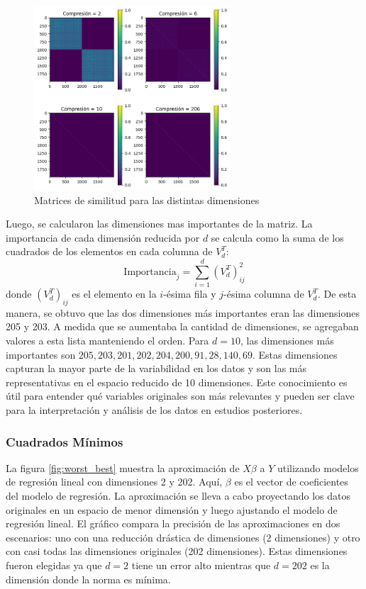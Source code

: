 \documentclass[12pt,a4]{article} %
\begin{document}
\begin{figure}[H]
    \centering
    \includegraphics[width=0.65\textwidth]{latex_project/plots1/matriz_similaridad.png}
    \caption{Matrices de similitud para las distintas dimensiones}
    \label{fig:similarity_matrix}
\end{figure}
Luego, se calcularon las dimensiones mas importantes de la matriz. La importancia de cada dimensión reducida por $d$ se calcula como la suma de los cuadrados de los elementos en cada columna de \(V^T_d\):
   \[
   \text{Importancia}_j = \sum_{i=1}^d (V^T_d)_{ij}^2
   \]
   donde \((V^T_d)_{ij}\) es el elemento en la \(i\)-ésima fila y \(j\)-ésima columna de \(V^T_d\). De esta manera, se obtuvo que las dos dimensiones más importantes eran las dimensiones 205 y 203. A medida que se aumentaba la cantidad de dimensiones, se agregaban valores a esta lista manteniendo el orden. Para \(d=10\), las dimensiones más importantes son \(205, 203, 201, 202, 204, 200, 91, 28, 140, 69\). Estas dimensiones capturan la mayor parte de la variabilidad en los datos y son las más representativas en el espacio reducido de 10 dimensiones. Este conocimiento es útil para entender qué variables originales son más relevantes y pueden ser clave para la interpretación y análisis de los datos en estudios posteriores.


\subsubsection{Cuadrados Mínimos}


La figura \ref{fig:worst_best} muestra la aproximación de $X\beta$ a $Y$ utilizando modelos de regresión lineal con dimensiones 2 y 202. Aquí, $\beta$ es el vector de coeficientes del modelo de regresión. La aproximación se lleva a cabo proyectando los datos originales en un espacio de menor dimensión y luego ajustando el modelo de regresión lineal. El gráfico compara la precisión de las aproximaciones en dos escenarios: uno con una reducción drástica de dimensiones (2 dimensiones) y otro con casi todas las dimensiones originales (202 dimensiones). Estas dimensiones fueron elegidas ya que $d=2$ tiene un error alto mientras que $d=202$ es la dimensión donde la norma es mínima. 
\end{document}
